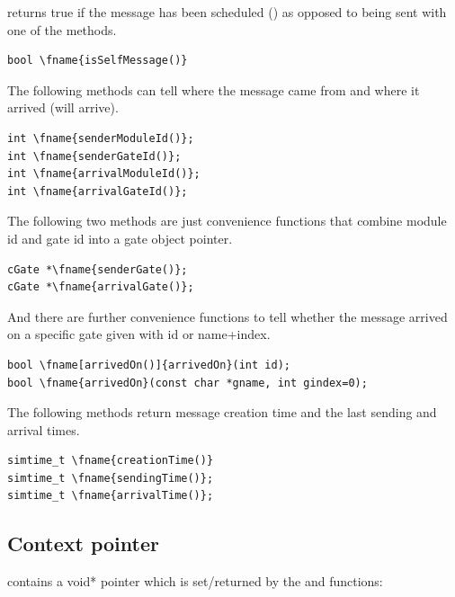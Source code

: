  returns true if the message has been scheduled
() as opposed to being sent with one of the
 methods.

\begin{Verbatim}[commandchars=\\\{\}]
bool \fname{isSelfMessage()}
\end{Verbatim}

The following methods can tell where the message came from and
where it arrived (will arrive).

\begin{Verbatim}[commandchars=\\\{\}]
int \fname{senderModuleId()};
int \fname{senderGateId()};
int \fname{arrivalModuleId()};
int \fname{arrivalGateId()};
\end{Verbatim}

The following two methods are just convenience functions that
combine module id and gate id into a gate object pointer.

\begin{Verbatim}[commandchars=\\\{\}]
cGate *\fname{senderGate()};
cGate *\fname{arrivalGate()};
\end{Verbatim}

And there are further convenience functions to tell whether
the message arrived on a specific gate given with id or
name+index.

\begin{Verbatim}[commandchars=\\\{\}]
bool \fname[arrivedOn()]{arrivedOn}(int id);
bool \fname{arrivedOn}(const char *gname, int gindex=0);
\end{Verbatim}

The following methods return message creation time and the last sending
and arrival times.

\begin{Verbatim}[commandchars=\\\{\}]
simtime_t \fname{creationTime()}
simtime_t \fname{sendingTime()};
simtime_t \fname{arrivalTime()};
\end{Verbatim}




\subsection{Context pointer}

 contains a void* pointer which is
set/returned by the  and
 functions:

